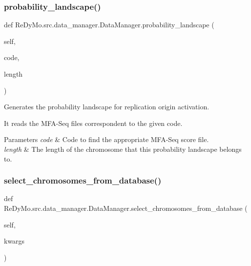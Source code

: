 \subsubsection{\texorpdfstring{probability\+\_\+landscape()}{probability\_landscape()}}
{\footnotesize\ttfamily def Re\+Dy\+Mo.\+src.\+data\+\_\+manager.\+Data\+Manager.\+probability\+\_\+landscape (\begin{DoxyParamCaption}\item[{}]{self,  }\item[{}]{code,  }\item[{}]{length }\end{DoxyParamCaption})}



Generates the probability landscape for replication origin activation. 

It reads the M\+F\+A-\/\+Seq files correspondent to the given code. 
\begin{DoxyParams}{Parameters}
{\em code} & Code to find the appropriate M\+F\+A-\/\+Seq score file. \\
\hline
{\em length} & The length of the chromosome that this probability landscape belongs to. \\
\hline
\end{DoxyParams}
\mbox{\label{classReDyMo_1_1src_1_1data__manager_1_1DataManager_afc9590b6ec6ab95c33bfa2f44b0da404}} 
\subsubsection{\texorpdfstring{select\+\_\+chromosomes\+\_\+from\+\_\+database()}{select\_chromosomes\_from\_database()}}
{\footnotesize\ttfamily def Re\+Dy\+Mo.\+src.\+data\+\_\+manager.\+Data\+Manager.\+select\+\_\+chromosomes\+\_\+from\+\_\+database (\begin{DoxyParamCaption}\item[{}]{self,  }\item[{}]{kwargs }\end{DoxyParamCaption})}



